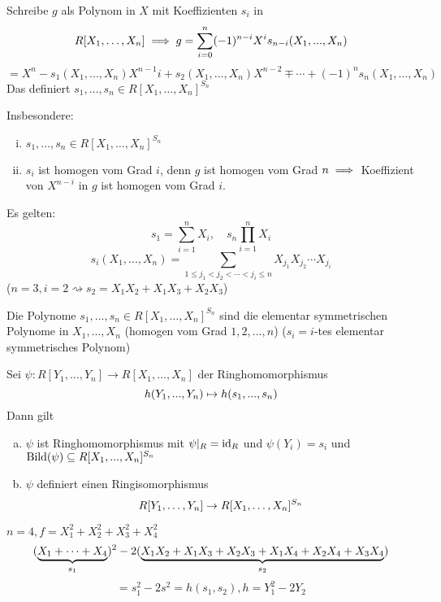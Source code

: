 \documentclass[a4paper]{report}
\begin{document}
\begin{bem*}
  Schreibe $g$ als Polynom in $X$ mit Koeffizienten $s_{i}$ in
  \[R[X_{1}, \ldots, X_{n}] \implies g = \sum_{i=0}^n (-1)^{n-i}X^{i}s_{n-i}(X_{1},...,X_{n})\]
  \[ = X^{n} - s_{1}(X_{1}, ..., X_{n})X^{n-1}i + s_{2}(X_{1}, ..., X_{n})X^{n-2} \mp \cdots + (-1)^{n}s_{n}(X_{1}, ..., X_{n})\]
  Das definiert $s_{1}, ..., s_{n} \in R[X_{1}, \ldots, X_{n}]^{S_{n}}$
  \item Insbesondere:
  \begin{enumerate}[(i)]
    \item $s_{1}, ..., s_{n} \in R[X_{1}, \ldots, X_{n}]^{S_{n}}$
    \item $s_{i}$ ist homogen vom Grad $i$, denn $g$ ist homogen vom Grad $n \implies $ Koeffizient von $X^{n-i}$ in $g$ ist homogen vom Grad $i$.
  \end{enumerate}
\end{bem*}

\begin{ubng}
  Es gelten:
  \[s_{1} = \sum_{i=1}^n X_{i}, \quad s_{n} \prod_{i=1}^n X_{i}\]
  \[s_{i}(X_{1}, ..., X_{n}) = \sum_{1 \le j_{1} < j_{2} < \cdots < j_{i} \le n} X_{j_{1}}X_{j_{2}}\cdots X_{j_{i}}\]
  ($n=3, i = 2 \rightsquigarrow s_{2} = X_{1}X_{2} + X_{1}X_{3} + X_{2}X_{3}$)
\end{ubng}

\begin{defi}
Die Polynome $s_{1}, ..., s_{n} \in R[X_{1}, \ldots, X_{n}]^{S_{n}}$ sind die elementar symmetrischen Polynome in $X_{1}, ..., X_{n}$ (homogen vom Grad $1, 2, ..., n$) ($s_{i} = i$-tes elementar symmetrisches Polynom)
\end{defi}

\begin{satz}
  Sei $\psi: R[Y_{1}, \ldots, Y_{n}] \to R[X_{1}, \ldots, X_{n}]$ der Ringhomomorphismus \[h(Y_{1}, ..., Y_{n}) \mapsto h(s_{1}, ..., s_{n})\]
  Dann gilt
  \begin{enumerate}[(a)]
    \item $\psi$ ist Ringhomomorphismus mit $\psi|_{R} = \operatorname{id}_{R}$ und $\psi(Y_{i}) = s_{i}$ und $\operatorname{Bild}(\psi) \subseteq R[X_{1}, ..., X_{n}]^{S_{n}}$
    \item $\psi$ definiert einen Ringisomorphismus
          \[R[Y_{1}, \ldots, Y_{n}] \to R[X_{1}, \ldots, X_{n}]^{S_n}\]
  \end{enumerate}
\end{satz}

\begin{bsp*}
  $n = 4, f = X_{1}^{2} + X_{2}^{2} + X_{3}^{2} + X_{4}^{2}$
  \[(\underbrace{X_{1} + \cdots + X_{4}}_{s_{1}})^{2} - 2(\underbrace{X_{1}X_{2} + X_{1}X_{3} + X_{2}X_{3} + X_{1}X_{4} + X_{2}X_{4} + X_{3}X_{4}}_{s_{2}})\]
  \[ = s_{1}^{2} - 2s^{2} = h(s_{1}, s_{2}), h = Y_{1}^{2} - 2Y_{2}\]
\end{bsp*}
\end{document}
